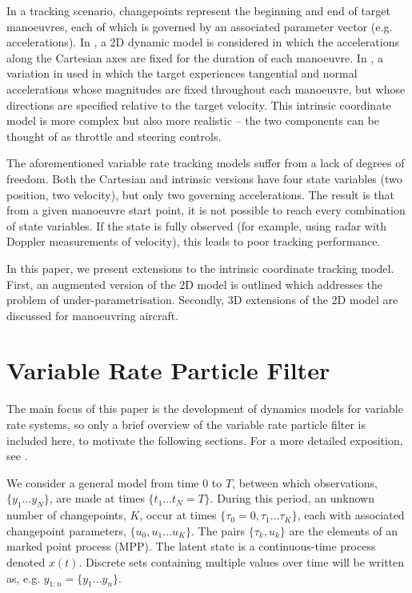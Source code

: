 \documentclass[conference]{IEEEtran}
\begin{document}
In a tracking scenario, changepoints represent the beginning and end of target manoeuvres, each of which is governed by an associated parameter vector (e.g. accelerations). In \cite{Whiteley2011}, a 2D dynamic model is considered in which the accelerations along the Cartesian axes are fixed for the duration of each manoeuvre. In \cite{Godsill2007}, a variation in used in which the target experiences tangential and normal accelerations whose magnitudes are fixed throughout each manoeuvre, but whose directions are specified relative to the target velocity. This intrinsic coordinate model is more complex but also more realistic -- the two components can be thought of as throttle and steering controls.

The aforementioned variable rate tracking models suffer from a lack of degrees of freedom. Both the Cartesian and intrinsic versions have four state variables (two position, two velocity), but only two governing accelerations. The result is that from a given manoeuvre start point, it is not possible to reach every combination of state variables. If the state is fully observed (for example, using radar with Doppler measurements of velocity), this leads to poor tracking performance.

In this paper, we present extensions to the intrinsic coordinate tracking model. First, an augmented version of the 2D model is outlined which addresses the problem of under-parametrisation. Secondly, 3D extensions of the 2D model are discussed for manoeuvring aircraft.



\section{Variable Rate Particle Filter}

The main focus of this paper is the development of dynamics models for variable rate systems, so only a brief overview of the variable rate particle filter is included here, to motivate the following sections. For a more detailed exposition, see \cite{Godsill2007a,Godsill2007,Whiteley2011}.

We consider a general model from time $0$ to $T$, between which observations, $\{y_1 \dots y_N\}$, are made at times $\{t_1 \dots t_N = T\}$. During this period, an unknown number of changepoints, $K$, occur at times $\{\tau_0 = 0, \tau_1 \dots \tau_K \}$, each with associated changepoint parameters, $\{ u_0, u_1 \dots u_K \}$. The pairs $\{\tau_k, u_k\}$ are the elements of an marked point process (MPP). The latent state is a continuous-time process denoted $x(t)$. Discrete sets containing multiple values over time will be written as, e.g. $y_{1:n} = \{y_1 \dots y_n\}$.
\end{document}
